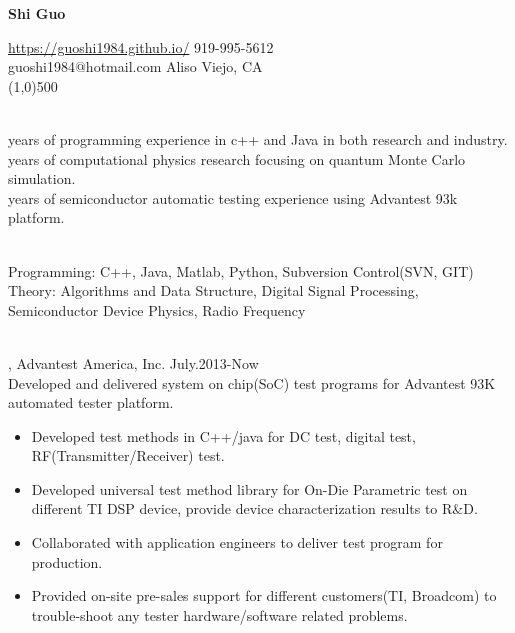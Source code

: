 \documentclass[11pt]{article} %
\begin{document}
 \centerline{\Large \bf Shi Guo}
  \noindent \url{https://guoshi1984.github.io/} \hspace{80mm}  919-995-5612\\
    guoshi1984@hotmail.com \hspace{95mm}   Aliso Viejo, CA\\
\line(1,0){500}


\vspace{2mm}

\\
 years of programming experience in c++ and Java in both research and industry.  \\
 years of computational physics research focusing on quantum Monte Carlo simulation. \\
 years of semiconductor automatic testing experience using Advantest 93k platform.\\


\vspace{0mm}

\\
\noindent 
Programming: C++, Java, Matlab, Python, Subversion Control(SVN, GIT)\\
Theory: Algorithms and Data Structure, Digital Signal Processing, Semiconductor Device Physics, Radio Frequency\\



\vspace{0mm}

\\
, Advantest America, Inc. July.2013-Now\\
\noindent Developed and delivered system on chip(SoC) test programs for Advantest 93K automated tester platform.\\ 
\begin{itemize}
  
    \item Developed test methods in C++/java for DC test, digital test, RF(Transmitter/Receiver) test.\\
 \vspace{-4mm}
    \item  Developed universal test method library for On-Die Parametric test on different TI DSP device, provide device characterization results to R\&D.\\ 
 \vspace{-4mm}
  \item Collaborated with application engineers to deliver test program for production.\\
 \vspace{-4mm}
  \item Provided on-site pre-sales support for different customers(TI, Broadcom) to trouble-shoot any tester hardware/software related problems.\\ 
 \end{itemize}
\end{document}
